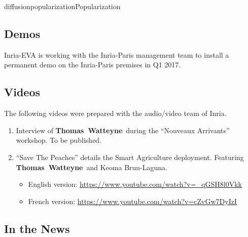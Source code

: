 \documentclass{ra2016}
\newcommand{\thomas}           {\textbf{Thomas~Watteyne}}
\begin{document}
\begin{module}{diffusion}{popularization}{Popularization}

\subsection{Demos}

Inria-EVA is working with the Inria-Paris management team to install a permanent demo on the Inria-Paris premises in Q1 2017.

\subsection{Videos}

The following videos were prepared with the audio/video team of Inria.

\begin{enumerate}
    \item Interview of \thomas~during the ``Nouveaux Arrivants'' workshop.
        To be published.
    \item ``Save The Peaches'' details the Smart Agriculture deployment.
        Featuring \thomas~and Keoma Brun-Laguna.
        \begin{itemize}
            \item English version: \url{https://www.youtube.com/watch?v=_qGSH8l0Vkk}
            \item French version:  \url{https://www.youtube.com/watch?v=cZvGw7DyIzI}
        \end{itemize}
\end{enumerate}

\subsection{In the News}


\end{module}
\end{document}
